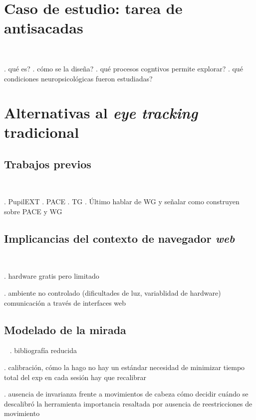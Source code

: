 \documentclass[aspectratio=169]{beamer}
\begin{document}
\section{Caso de estudio: tarea de antisacadas}

\begin{frame}{~}

. qué es?
. cómo se la diseña?
. qué procesos cogntivos permite explorar?
. qué condiciones neuropsicológicas fueron estudiadas?

\end{frame}

\section{Alternativas al \textit{eye tracking} tradicional}

\subsection{Trabajos previos}

\begin{frame}{~}

. PupilEXT
. PACE
. TG
. Último hablar de WG y señalar como construyen sobre PACE y WG

\end{frame}

\subsection{Implicancias del contexto de navegador \textit{web}}

\begin{frame}{~}

. hardware gratis pero limitado

. ambiente no controlado (dificultades de luz, variablidad de hardware)
  comunicación a través de interfaces web

\end{frame}

\subsection{Modelado de la mirada}

\begin{frame}{~}
. bibliografía reducida

. calibración, cómo la hago
  no hay un estándar
  necesidad de minimizar tiempo total del exp
  en cada sesión hay que recalibrar

. ausencia de invarianza frente a movimientos de cabeza
  cómo decidir cuándo se descalibró la herramienta
  importancia resaltada por ausencia de reestricciones de movimiento
\end{frame}
\end{document}
